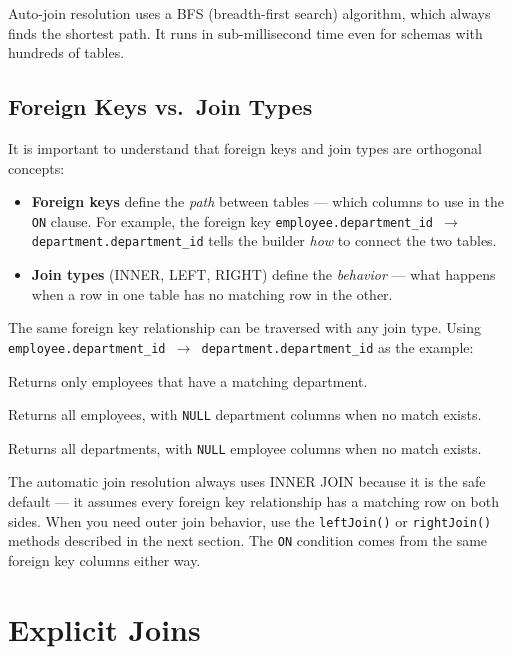 \begin{notebox}
Auto-join resolution uses a BFS (breadth-first search) algorithm, which always finds the shortest path.  It runs in sub-millisecond time even for schemas with hundreds of tables.
\end{notebox}

\subsection{Foreign Keys vs.\ Join Types}

It is important to understand that foreign keys and join types are orthogonal concepts:

\begin{itemize}
  \item \textbf{Foreign keys} define the \emph{path} between tables --- which columns to use in the \texttt{ON} clause.  For example, the foreign key \texttt{employee.department\_id $\rightarrow$ department.department\_id} tells the builder \emph{how} to connect the two tables.
  \item \textbf{Join types} (INNER, LEFT, RIGHT) define the \emph{behavior} --- what happens when a row in one table has no matching row in the other.
\end{itemize}

\noindent
The same foreign key relationship can be traversed with any join type.  Using \texttt{employee.department\_id $\rightarrow$ department.department\_id} as the example:

\begin{description}[style=nextline]
  \item[INNER JOIN] Returns only employees that have a matching department.
  \item[LEFT JOIN] Returns all employees, with \texttt{NULL} department columns when no match exists.
  \item[RIGHT JOIN] Returns all departments, with \texttt{NULL} employee columns when no match exists.
\end{description}

\noindent
The automatic join resolution always uses INNER JOIN because it is the safe default --- it assumes every foreign key relationship has a matching row on both sides.  When you need outer join behavior, use the \texttt{leftJoin()} or \texttt{rightJoin()} methods described in the next section.  The \texttt{ON} condition comes from the same foreign key columns either way.

\section{Explicit Joins}
\label{sec:qb-explicit}

